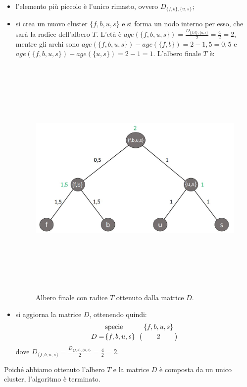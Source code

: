 \begin{itemize}
	\item l'elemento più piccolo è l'unico rimasto, ovvero $D_{\{f, b\}, \{u, s\}}$;
	\item si crea un nuovo cluster $\{f, b, u, s\}$ e si forma un nodo interno per esso, che sarà la radice dell'albero $T$. L'età è $age(\{f, b, u, s\})=\frac{D_{\{f, b\}, \{u, s\}}}{2}=\frac{4}{2}=2$, mentre gli archi sono $age(\{f, b, u, s\})-age(\{f, b\})=2-1,5=0,5$ e $age(\{f, b, u, s\})-age(\{u, s\})=2-1=1$. 
	\newline
	L'albero finale $T$ è:
	\begin{figure}[h!]
\centering
	\includegraphics[height=12cm, width=14cm,keepaspectratio]{rooted_upgma_7.jpg}
 	\caption{Albero finale con radice $T$ ottenuto dalla matrice $D$.}
  	\label{fig:rooted_upgma_7}
  	\end{figure}
  	\item si aggiorna la matrice $D$, ottenendo quindi:
  		\[
  		D = \bordermatrix{\text{specie}&\{f, b, u, s\}\cr
                \{f, b, u ,s\}& 2}
                \]
dove $D_{\{f, b, u, s\}}=\frac{D_{\{f, b\}, \{u, s\}}}{2}=\frac{4}{2}=2$.
\end{itemize}
Poiché abbiamo ottenuto l'albero $T$ e la matrice $D$ è composta da un unico cluster, l'algoritmo è terminato.

\newpage

